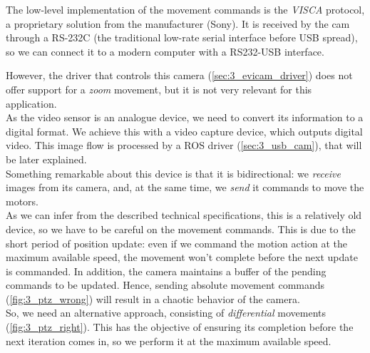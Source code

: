 		The low-level implementation of the movement commands is the \emph{VISCA} protocol, a proprietary solution from the manufacturer (Sony). It is received by the cam through a RS-232C (the traditional low-rate serial interface before USB spread), so we can connect it to a modern computer with a RS232-USB interface.

		However, the driver that controls this camera (\autoref{sec:3_evicam_driver}) does not offer support for a \emph{zoom} movement, but it is not very relevant for this application.\\

		As the video sensor is an analogue device, we need to convert its information to a digital format. We achieve this with a video capture device, which outputs digital video. This image flow is processed by a ROS driver (\autoref{sec:3_usb_cam}), that will be later explained.\\

		Something remarkable about this device is that it is bidirectional: we \textit{receive} images from its camera, and, at the same time, we \textit{send} it commands to move the motors.\\
		
		As we can infer from the described technical specifications, this is a relatively old device, so we have to be careful on the movement commands. This is due to the short period of position update: even if we command the motion action at the maximum available speed, the movement won't complete before the next update is commanded. In addition, the camera maintains a buffer of the pending commands to be updated. Hence, sending absolute movement commands (\autoref{fig:3_ptz_wrong}) will result in a chaotic behavior of the camera.\\
		
		So, we need an alternative approach, consisting of \emph{differential} movements (\autoref{fig:3_ptz_right}). This has the objective of ensuring its completion before the next iteration comes in, so we perform it at the maximum available speed.

